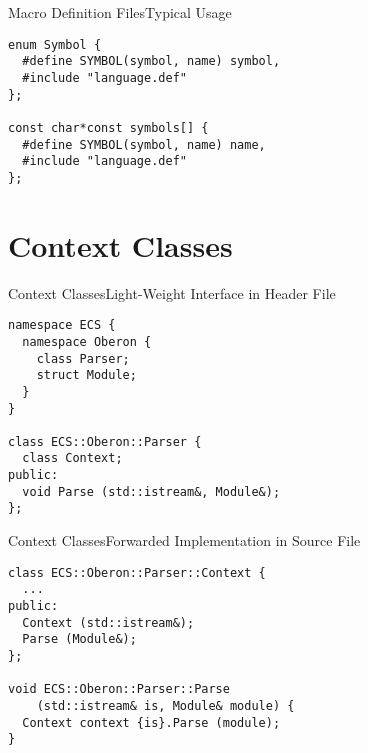 \begin{frame}[fragile]{Macro Definition Files}{Typical Usage}\nocite{assembly}
\begin{small}\begin{center}\begin{minipage}{20em}\begin{verbatim}
enum Symbol {
  #define SYMBOL(symbol, name) symbol,
  #include "language.def"
};

const char*const symbols[] {
  #define SYMBOL(symbol, name) name,
  #include "language.def"
};
\end{verbatim}\end{minipage}\end{center}\end{small}
\end{frame}

\section{Context Classes}

\begin{frame}[fragile]{Context Classes}{Light-Weight Interface in Header File}
\begin{small}\begin{center}\begin{minipage}{20em}\begin{verbatim}
namespace ECS {
  namespace Oberon {
    class Parser;
    struct Module;
  }
}

class ECS::Oberon::Parser {
  class Context;
public:
  void Parse (std::istream&, Module&);
};
\end{verbatim}\end{minipage}\end{center}\end{small}
\end{frame}

\begin{frame}[fragile]{Context Classes}{Forwarded Implementation in Source File}
\begin{small}\begin{center}\begin{minipage}{21em}\begin{verbatim}
class ECS::Oberon::Parser::Context {
  ...
public:
  Context (std::istream&);
  Parse (Module&);
};

void ECS::Oberon::Parser::Parse
    (std::istream& is, Module& module) {
  Context context {is}.Parse (module);
}
\end{verbatim}\end{minipage}\end{center}\end{small}
\end{frame}

